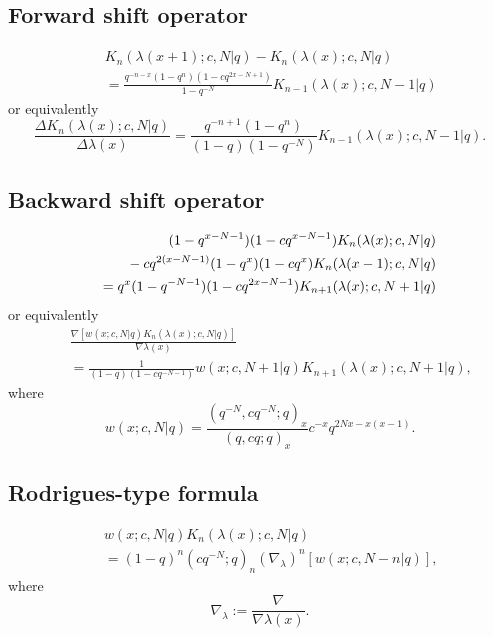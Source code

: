 \documentclass[envcountchap,graybox]{svmono}
\newcommand{\mathindent}{\hspace{7.5mm}}
\begin{document}
{\newpage

\subsection*{Forward shift operator}
\begin{eqnarray}
\label{shift1DualqKrawtchoukI}
& &K_n(\lambda(x+1);c,N|q)-K_n(\lambda(x);c,N|q)\nonumber\\
& &{}=\frac{q^{-n-x}(1-q^n)(1-cq^{2x-N+1})}{1-q^{-N}}
K_{n-1}(\lambda(x);c,N-1|q)
\end{eqnarray}
or equivalently
\begin{equation}
\label{shift1DualqKrawtchoukII}
\frac{\Delta K_n(\lambda(x);c,N|q)}{\Delta\lambda(x)}=
\frac{q^{-n+1}(1-q^n)}{(1-q)(1-q^{-N})}K_{n-1}(\lambda(x);c,N-1|q).
\end{equation}

\subsection*{Backward shift operator}
\begin{eqnarray}
\label{shift2DualqKrawtchoukI}
& &(1-q^{x-N-1})(1-cq^{x-N-1})K_n(\lambda(x);c,N|q)\nonumber\\
& &{}\mathindent{}-cq^{2(x-N-1)}(1-q^x)(1-cq^x)K_n(\lambda(x-1);c,N|q)\nonumber\\
& &{}=q^x(1-q^{-N-1})(1-cq^{2x-N-1})K_{n+1}(\lambda(x);c,N+1|q)
\end{eqnarray}
or equivalently
\begin{eqnarray}
\label{shift2DualqKrawtchoukII}
& &\frac{\nabla\left[w(x;c,N|q)K_n(\lambda(x);c,N|q)\right]}{\nabla\lambda(x)}\nonumber\\
& &{}=\frac{1}{(1-q)(1-cq^{-N-1})}w(x;c,N+1|q)K_{n+1}(\lambda(x);c,N+1|q),
\end{eqnarray}
where
$$w(x;c,N|q)=\frac{(q^{-N},cq^{-N};q)_x}{(q,cq;q)_x}c^{-x}q^{2Nx-x(x-1)}.$$

\subsection*{Rodrigues-type formula}
\begin{eqnarray}
\label{RodDualqKrawtchouk}
& &w(x;c,N|q)K_n(\lambda(x);c,N|q)\nonumber\\
& &{}=(1-q)^n(cq^{-N};q)_n\left(\nabla_{\lambda}\right)^n\left[w(x;c,N-n|q)\right],
\end{eqnarray}
where
$$\nabla_{\lambda}:=\frac{\nabla}{\nabla\lambda(x)}.$$

}
\end{document}
